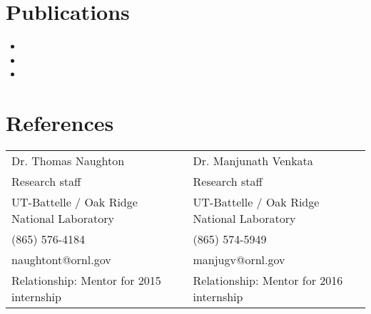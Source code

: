 \documentclass[10pt]{res}
\newcommand{\tightensection}{\vspace{-5mm}}
\begin{document}
\begin{resume}
\tightensection
\section{Publications}
\begin{itemize}
    \item {}
    \item {}
    \item {}
\end{itemize}

\tightensection
\section{References}
\vspace{2mm}
\begin{tabularx}{\textwidth}{X X}
Dr. Thomas Naughton  & Dr. Manjunath Venkata \\
Research staff & Research staff \\
UT-Battelle / Oak Ridge National Laboratory & UT-Battelle / Oak Ridge National Laboratory \\
(865) 576-4184 & (865) 574-5949 \\
naughtont@ornl.gov & manjugv@ornl.gov \\
Relationship: Mentor for 2015 internship & Relationship: Mentor for 2016 internship
\end{tabularx}
%
\end{resume}
\end{document}
